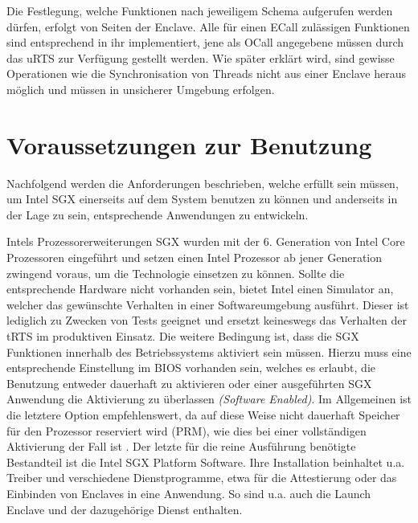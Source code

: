 Die Festlegung, welche Funktionen nach jeweiligem Schema aufgerufen werden dürfen, erfolgt von Seiten der Enclave. Alle für einen \ac{ECall} zulässigen Funktionen sind entsprechend in ihr implementiert, jene als \ac{OCall} angegebene müssen durch das \ac{uRTS} zur Verfügung gestellt werden. Wie später erklärt wird, sind gewisse Operationen wie die Synchronisation von Threads nicht aus einer Enclave heraus möglich und müssen in unsicherer Umgebung erfolgen.

\section{Voraussetzungen zur Benutzung}

Nachfolgend werden die Anforderungen beschrieben, welche erfüllt sein müssen, um Intel \ac{SGX} einerseits auf dem System benutzen zu können und anderseits in der Lage zu sein, entsprechende Anwendungen zu entwickeln.

Intels Prozessorerweiterungen \ac{SGX} wurden mit der 6. Generation von Intel Core Prozessoren eingeführt und setzen einen Intel Prozessor ab jener Generation zwingend voraus, um die Technologie einsetzen zu können. Sollte die entsprechende Hardware nicht vorhanden sein, bietet Intel einen Simulator an, welcher das gewünschte Verhalten in einer Softwareumgebung ausführt. Dieser ist lediglich zu Zwecken von Tests geeignet und ersetzt keineswegs das Verhalten der \ac{tRTS} im produktiven Einsatz. Die weitere Bedingung ist, dass die \ac{SGX} Funktionen innerhalb des Betriebssystems aktiviert sein müssen. Hierzu muss eine entsprechende Einstellung im \ac{BIOS} vorhanden sein, welches es erlaubt, die Benutzung entweder dauerhaft zu aktivieren oder einer ausgeführten \ac{SGX} Anwendung die Aktivierung zu überlassen \textit{(Software Enabled)}. Im Allgemeinen ist die letztere Option empfehlenswert, da auf diese Weise nicht dauerhaft Speicher für den Prozessor reserviert wird (\ac{PRM}), wie dies bei einer vollständigen Aktivierung der Fall ist \cite{SGXDetection}. Der letzte für die reine Ausführung benötigte Bestandteil ist die Intel \ac{SGX} Platform Software. Ihre Installation beinhaltet u.a. Treiber und verschiedene Dienstprogramme, etwa für die Attestierung oder das Einbinden von Enclaves in eine Anwendung. So sind u.a. auch die Launch Enclave und der dazugehörige Dienst enthalten.

